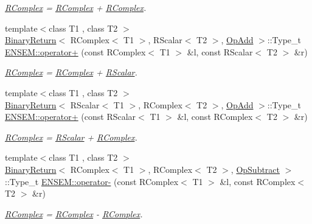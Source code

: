 \begin{DoxyCompactItemize}
\begin{DoxyCompactList}\small\item\em \mbox{\hyperlink{classENSEM_1_1RComplex}{R\+Complex}} = \mbox{\hyperlink{classENSEM_1_1RComplex}{R\+Complex}} + \mbox{\hyperlink{classENSEM_1_1RComplex}{R\+Complex}}. \end{DoxyCompactList}\item 
{\footnotesize template$<$class T1 , class T2 $>$ }\\\mbox{\hyperlink{structBinaryReturn}{Binary\+Return}}$<$ R\+Complex$<$ T1 $>$, R\+Scalar$<$ T2 $>$, \mbox{\hyperlink{structOpAdd}{Op\+Add}} $>$\+::Type\+\_\+t \mbox{\hyperlink{group__rcomplex_gacf34d655d02ee81a131842116e13d950}{E\+N\+S\+E\+M\+::operator+}} (const R\+Complex$<$ T1 $>$ \&l, const R\+Scalar$<$ T2 $>$ \&r)
\begin{DoxyCompactList}\small\item\em \mbox{\hyperlink{classENSEM_1_1RComplex}{R\+Complex}} = \mbox{\hyperlink{classENSEM_1_1RComplex}{R\+Complex}} + \mbox{\hyperlink{classENSEM_1_1RScalar}{R\+Scalar}}. \end{DoxyCompactList}\item 
{\footnotesize template$<$class T1 , class T2 $>$ }\\\mbox{\hyperlink{structBinaryReturn}{Binary\+Return}}$<$ R\+Scalar$<$ T1 $>$, R\+Complex$<$ T2 $>$, \mbox{\hyperlink{structOpAdd}{Op\+Add}} $>$\+::Type\+\_\+t \mbox{\hyperlink{group__rcomplex_gad42347a2cdf1648efaec65d4b0f51651}{E\+N\+S\+E\+M\+::operator+}} (const R\+Scalar$<$ T1 $>$ \&l, const R\+Complex$<$ T2 $>$ \&r)
\begin{DoxyCompactList}\small\item\em \mbox{\hyperlink{classENSEM_1_1RComplex}{R\+Complex}} = \mbox{\hyperlink{classENSEM_1_1RScalar}{R\+Scalar}} + \mbox{\hyperlink{classENSEM_1_1RComplex}{R\+Complex}}. \end{DoxyCompactList}\item 
{\footnotesize template$<$class T1 , class T2 $>$ }\\\mbox{\hyperlink{structBinaryReturn}{Binary\+Return}}$<$ R\+Complex$<$ T1 $>$, R\+Complex$<$ T2 $>$, \mbox{\hyperlink{structOpSubtract}{Op\+Subtract}} $>$\+::Type\+\_\+t \mbox{\hyperlink{group__rcomplex_ga49dbda9bd7d00d928595979502979d9b}{E\+N\+S\+E\+M\+::operator-\/}} (const R\+Complex$<$ T1 $>$ \&l, const R\+Complex$<$ T2 $>$ \&r)
\begin{DoxyCompactList}\small\item\em \mbox{\hyperlink{classENSEM_1_1RComplex}{R\+Complex}} = \mbox{\hyperlink{classENSEM_1_1RComplex}{R\+Complex}} -\/ \mbox{\hyperlink{classENSEM_1_1RComplex}{R\+Complex}}. \end{DoxyCompactList}\item 

\end{DoxyCompactItemize}
